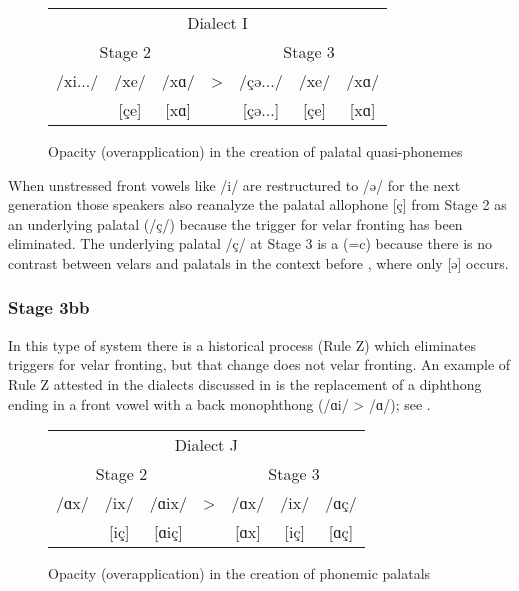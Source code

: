 \begin{xlist}
\begin{xlist}
\begin{figure}
\tabcolsep=3pt
\begin{tabular}{*{7}{c}}
\multicolumn{7}{c}{Dialect I}\\\cmidrule(lr){1-7}
\multicolumn{3}{c}{Stage 2} &   & \multicolumn{3}{c}{Stage 3}\\\cmidrule(lr){1-3}\cmidrule(lr){5-7}
      /xi.../ & /xe/ & /xɑ/ & > & /çə.../ & /xe/ & /xɑ/\\\relax
      [çi...] & [çe] & [xɑ] &   & [çə...] & [çe] & [xɑ]
\end{tabular}
\caption{\label{fig:2.11}Opacity (overapplication) in the creation of palatal quasi-phonemes}
\end{figure}

When unstressed front vowels like /i/ are restructured to /ə/ for the next generation those speakers also reanalyze the palatal allophone [ç] from Stage 2 as an underlying palatal (/ç/) because the trigger for velar fronting has been eliminated. The underlying palatal /ç/ at Stage 3 is a  (=c) because there is no contrast between velars and palatals in the context before , where only [ə] occurs.

\subsubsection{Stage 3bb}
In this type of system there is a historical process (Rule Z) which eliminates triggers for velar fronting, but that change does not  velar fronting. An example of Rule Z attested in the dialects discussed in  is the replacement of a diphthong ending in a front vowel with a back monophthong (/ɑi/ > /ɑ/); see .

\begin{figure}
\tabcolsep=3pt
 \begin{tabular}{*{7}{c}}
       \multicolumn{7}{c}{Dialect J}\\\cmidrule(lr){1-7}
       \multicolumn{3}{c}{Stage 2} & & \multicolumn{3}{c}{Stage 3}\\\cmidrule(lr){1-3}\cmidrule(lr){5-7}
        /ɑx/ & /ix/ &  /ɑix/ & > & /ɑx/ & /ix/ & /ɑç/\\\relax
        [ɑx] & [iç] &  [ɑiç] &   & [ɑx] & [iç] & [ɑç]\\
  \end{tabular}
\caption{\label{fig:2.12}Opacity (overapplication) in the creation of phonemic palatals}
\end{figure}


\end{xlist}
\end{xlist}
